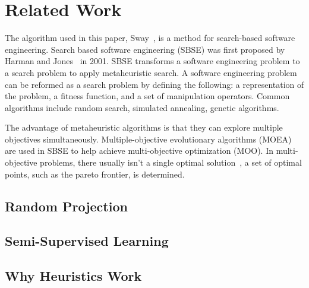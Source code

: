 \section{Related Work}
\label{sec:relwork}
The algorithm used in this paper, Sway~\cite{chen2018sampling}, is a
method for search-based software engineering.
Search based software engineering (SBSE) was first proposed by Harman and
Jones~\cite{harman2001search} in 2001. SBSE transforms a software
engineering problem to a search problem to apply metaheuristic search.
A software engineering problem can be reformed as a search problem by
defining the following: a representation of the problem, a fitness
function, and a set of manipulation operators. Common algorithms include
random search, simulated annealing, genetic algorithms.

The advantage of metaheuristic algorithms is that they can explore
multiple objectives simultaneously. Multiple-objective evolutionary
algorithms (MOEA) are used in SBSE to help achieve multi-objective
optimization (MOO). In multi-objective problems, there usually isn't a
single optimal solution~\cite{marler2004MOOsurvey}, a set of optimal
points, such as the pareto frontier, is determined. 


\subsection{Random Projection}

\subsection{Semi-Supervised Learning}

\subsection{Why Heuristics Work}
